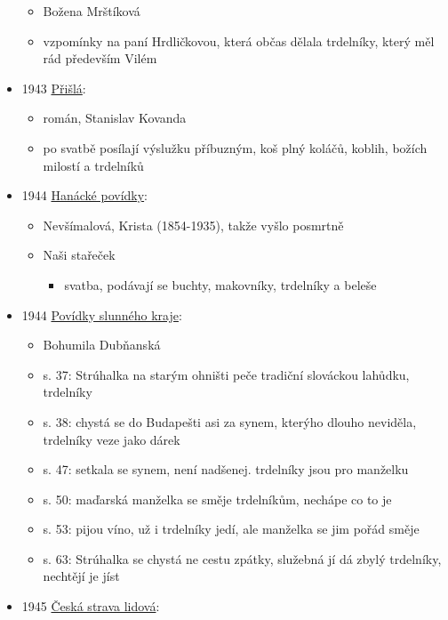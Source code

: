 \begin{itemize}
  \begin{itemize}
  \tightlist
  \item
    Božena Mrštíková
  \item
    vzpomínky na paní Hrdličkovou, která občas dělala trdelníky, který
    měl rád především Vilém
  \end{itemize}
\item
  1943
  \href{https://ceskadigitalniknihovna.cz/uuid/uuid:dc1db170-6fe9-11ed-a5ba-005056827e51}{Přišlá}:

  \begin{itemize}
  \tightlist
  \item
    román, Stanislav Kovanda
  \item
    po svatbě posílají výslužku příbuzným, koš plný koláčů, koblih,
    božích milostí a trdelníků
  \end{itemize}
\item
  1944
  \href{https://ceskadigitalniknihovna.cz/uuid/uuid:bca2a111-2a25-42f8-b998-2567d7c7e193}{Hanácké
  povídky}:

  \begin{itemize}
  \tightlist
  \item
    Nevšímalová, Krista (1854-1935), takže vyšlo posmrtně
  \item
    Naši stařeček

    \begin{itemize}
    \tightlist
    \item
      svatba, podávají se buchty, makovníky, trdelníky a beleše
    \end{itemize}
  \end{itemize}
\item
  1944
  \href{https://ceskadigitalniknihovna.cz/uuid/uuid:78576090-e45a-11e5-8d5f-005056827e51}{Povídky
  slunného kraje}:

  \begin{itemize}
  \tightlist
  \item
    Bohumila Dubňanská
  \item
    s. 37: Strúhalka na starým ohništi peče tradiční slováckou lahůdku,
    trdelníky
  \item
    s. 38: chystá se do Budapešti asi za synem, kterýho dlouho neviděla,
    trdelníky veze jako dárek
  \item
    s. 47: setkala se synem, není nadšenej. trdelníky jsou pro manželku
  \item
    s. 50: maďarská manželka se směje trdelníkům, nechápe co to je
  \item
    s. 53: pijou víno, už i trdelníky jedí, ale manželka se jim pořád
    směje
  \item
    s. 63: Strúhalka se chystá ne cestu zpátky, služebná jí dá zbylý
    trdelníky, nechtějí je jíst
  \end{itemize}
\item
  1945
  \href{https://ceskadigitalniknihovna.cz/view/uuid:89562bf0-7962-11e5-9690-005056827e51?page=uuid\%3A521d38f0-92de-11e5-bf6c-005056825209&fulltext=trdeln\%C3\%ADk\%20OR\%20trdeln\%C3\%ADky\%20OR\%20trdeln\%C3\%ADk\%C5\%AF&source=mzk}{Česká
  strava lidová}:


\end{itemize}
